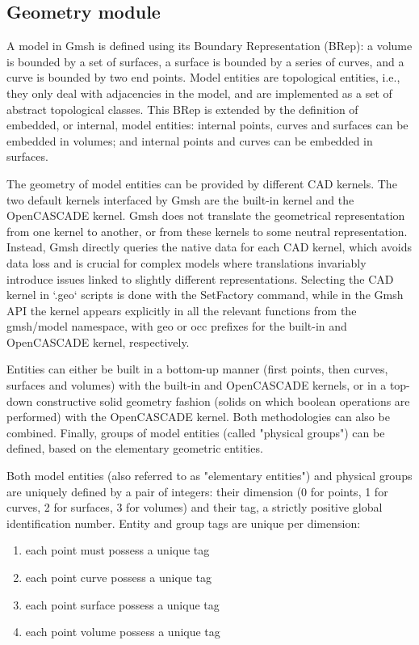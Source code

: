 \documentclass[dvipdfmx, 9pt, a4paper]{article}
\numberwithin{equation}{section}
\begin{document}
\subsection{Geometry module}
A model in Gmsh is defined using its Boundary Representation (BRep): a volume is bounded by a set of surfaces, a surface is bounded by a series of curves, and a curve is bounded by two end points. Model entities are topological entities, i.e., they only deal with adjacencies in the model, and are implemented as a set of abstract topological classes. This BRep is extended by the definition of embedded, or internal, model entities: internal points, curves and surfaces can be embedded in volumes; and internal points and curves can be embedded in surfaces. \par
The geometry of model entities can be provided by different CAD kernels. The two default kernels interfaced by Gmsh are the built-in kernel and the OpenCASCADE kernel. Gmsh does not translate the geometrical representation from one kernel to another, or from these kernels to some neutral representation. Instead, Gmsh directly queries the native data for each CAD kernel, which avoids data loss and is crucial for complex models where translations invariably introduce issues linked to slightly different representations.  Selecting the CAD kernel in `.geo` scripts is done with the SetFactory command, while in the Gmsh API the kernel appears explicitly in all the relevant functions from the gmsh/model namespace, with geo or occ prefixes for the built-in and OpenCASCADE kernel, respectively.\par
Entities can either be built in a bottom-up manner (first points, then curves, surfaces and volumes) with the built-in and OpenCASCADE kernels, or in a top-down constructive solid geometry fashion (solids on which boolean operations are performed) with the OpenCASCADE kernel. Both methodologies can also be combined. Finally, groups of model entities (called "physical groups") can be defined, based on the elementary geometric entities.\par
Both model entities (also referred to as "elementary entities") and physical groups are uniquely defined by a pair of integers: their dimension (0 for points, 1 for curves, 2 for surfaces, 3 for volumes) and their tag, a strictly positive global identification number. Entity and group tags are unique per dimension:
\begin{enumerate}
\item  each point must possess a unique tag
\item  each point curve possess a unique tag
\item  each point surface possess a unique tag
\item  each point volume possess a unique tag
\end{enumerate}
\end{document}
